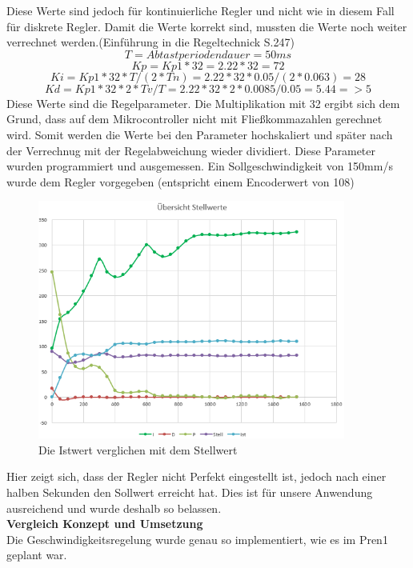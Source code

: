 Diese Werte sind jedoch für kontinuierliche Regler und nicht wie in diesem Fall für diskrete Regler. Damit die Werte korrekt sind, mussten die Werte noch weiter verrechnet werden.(Einführung in die Regeltechnick S.247)
\[ T=Abtastperiodendauer=50ms\]
\[ Kp=Kp1*32=2.22*32=72\]
\[ Ki=Kp1*32*T/(2*Tn)=2.22*32*0.05/(2*0.063)=28\]
\[ Kd=Kp1*32*2*Tv/T=2.22*32*2*0.0085/0.05=5.44 =>5\]
Diese Werte sind die Regelparameter. Die Multiplikation mit 32 ergibt sich dem Grund, dass auf dem Mikrocontroller nicht mit Fließkommazahlen gerechnet wird. Somit werden die Werte bei den Parameter hochskaliert und später nach der Verrechnug mit der Regelabweichung wieder dividiert.
Diese Parameter wurden programmiert und ausgemessen. Ein Sollgeschwindigkeit von 150mm/s wurde dem Regler vorgegeben (entspricht einem Encoderwert von 108)
\begin{figure}[H]%
\centering
\includegraphics[width=0.9\textwidth]{03_Loesungskonzept/pictures/StellwertePID.png}
\caption{Die Istwert verglichen mit dem Stellwert}
\label{fig:IstSollwertVergleich}
\end{figure}
Hier zeigt sich, dass der Regler nicht Perfekt eingestellt ist, jedoch nach einer halben Sekunden den Sollwert erreicht hat. Dies ist für unsere Anwendung ausreichend und wurde deshalb so belassen.\\[0.2cm]
\textbf{Vergleich Konzept und Umsetzung}\\[0.2cm]
Die Geschwindigkeitsregelung wurde genau so implementiert, wie es im Pren1 geplant war.
